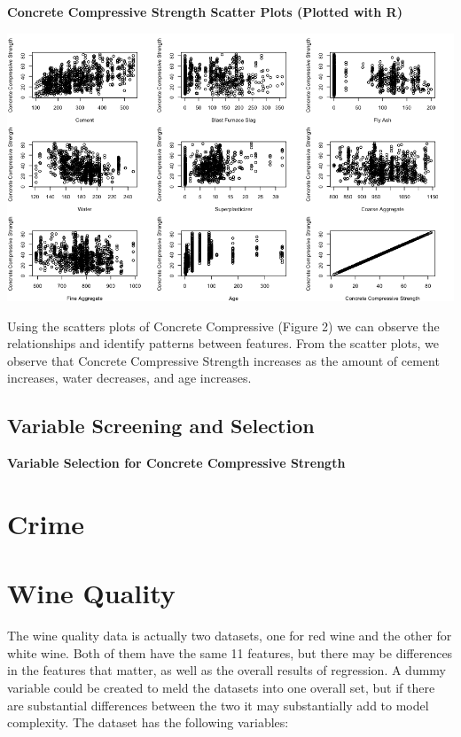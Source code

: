 \documentclass{article}
\begin{document}
	\textbf{ Concrete Compressive Strength Scatter Plots (Plotted with R)}
	
	\includegraphics[scale=0.55]{../plots/ConcreteCompressiveStrength/concrete-scatter.png}
	
	Using the scatters plots of Concrete Compressive (Figure 2) we can observe the relationships and identify patterns 
	between features. From the scatter plots, we observe that Concrete Compressive Strength increases as the amount of 
	cement increases, water decreases, and age increases.

	\subsection{Variable Screening and Selection}
	
	\textbf{Variable Selection for Concrete Compressive Strength} 


	\section{Crime}


	\section{Wine Quality}
	
	The wine quality data is actually two datasets, one for red wine and the other for white 
	wine. Both of them have the same 11 features, but there may be differences in the features 
	that matter, as well as the overall results of regression. A dummy variable could be created 
	to meld the datasets into one overall set, but if there are substantial differences between 
	the two it may substantially add to model complexity. The dataset has the following variables: 
	
\end{document}
